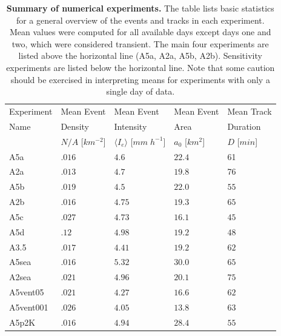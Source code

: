 \documentclass{article}
\begin{document}
\begin{table}[b]
\centering
\begin{tabular}{lllll}
    Experiment & Mean Event & Mean Event & Mean Event & Mean Track\\
    Name & Density & Intensity & Area & Duration\\
     & $N/A$ [$km^{-2}$] & $\langle I_e\rangle$ [$mm\;h^{-1}$] & $a_0$ [$km^2$] & $D$ [$min$]\\
    \hline
    A5a & $.016$ & $4.6$ & $22.4$ & 61 \\
    A2a & $.013$ & $4.7$ & $19.8$ & 76\\
    A5b & $.019$ & $4.5$ & $22.0$ & $55$\\
    A2b & $.016$ & $4.75$ & $19.3$ & $65$\\
    \hline
    A5c & $.027$ & $4.73$ & $16.1$ & $45$\\
    A5d & $.12$ & $4.98$ & $19.2$ & $48$\\
    A3.5 & $.017$ & $4.41$ & $19.2$ & $62$\\
    A5sea & $.016$ & $5.32$ & $30.0$ & $65$\\
    A2sea & $.021$ & $4.96$ & $20.1$ & $75$\\
    A5vent05 & $.021$ & $4.27$ & $16.6$ & $62$\\
    A5vent001 & $.026$ & $4.05$ & $13.8$ & $63$\\
    A5p2K & $.016$ & $4.94$ & $28.4$ & $55$\\
    \hline
\end{tabular}
\caption{{\bf Summary of numerical experiments.}
The table lists basic statistics for a general overview of the events and tracks in each experiment. 
Mean values were computed for all available days except days one and two, which were considered transient. 
The main four experiments are listed above the horizontal line (A5a, A2a, A5b, A2b). 
Sensitivity experiments are listed below the horizontal line. 
Note that some caution should be exercised in interpreting means for experiments with only a single day of data.
}
\label{tab:basic_stats}
\end{table}
\end{document}
